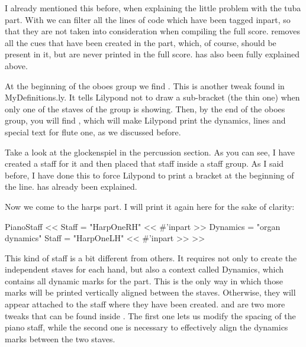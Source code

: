 \documentclass[../../LilyPond-Tutorials]{subfiles}
\begin{document}
I already mentioned this before, when explaining the little problem with the tuba  part.
With  we can filter all the lines of code which have been tagged inpart, so that they are not taken into consideration when compiling the full score.
 removes all the cues that have been created in the part, which, of course, should be present in it, but are never printed in the full score.
 has also been fully explained above.

At the beginning of the oboes group we find .
This is another tweak found in MyDefinitions.ly.
It tells Lilypond not to draw a sub-bracket (the thin one) when only one of the staves of the group is showing.
Then, by the end of the oboes group, you will find , which will make Lilypond print the dynamics, lines and special text for flute one, as we discussed before.

Take a look at the glockenspiel in the percussion section.
As you can see, I have created a staff for it and then placed that staff inside a staff group. 
As I said before, I have done this to force Lilypond to print a bracket at the beginning of the line.
 has already been explained.

Now we come to the harps part.
I will print it again here for the sake of clarity:

\begin{lilypondcode}
\new PianoStaff \with { \HarpsHeading \KeyboardStaffSpacing } <<
       \new Staff = "HarpOneRH" \with { 
              \ShowEmptyStaves } << 
              \removeWithTag #'inpart { \killCues { \HarpOneRH } } >>
       \new Dynamics = "organ dynamics" 
              { \KeyboardCenteredDynamics \HarpOneDynamics }
       \new Staff = "HarpOneLH" \with { 
              \ShowEmptyStaves } << 
              \removeWithTag #'inpart { \killCues { \HarpOneLH } } >>
>> %
\end{lilypondcode}

This kind of staff is a bit different from others.
It requires not only to create the independent staves for each hand, but also a context called Dynamics, which contains all dynamic marks for the part.
This is the only way in which those marks will be printed vertically aligned between the staves.
Otherwise, they will appear attached to the staff where they have been created.
 and  are two more tweaks that can be found inside .
The first one lets us modify the spacing of the piano staff, while the second one is necessary to effectively align the dynamics marks between the two staves.
\end{document}
